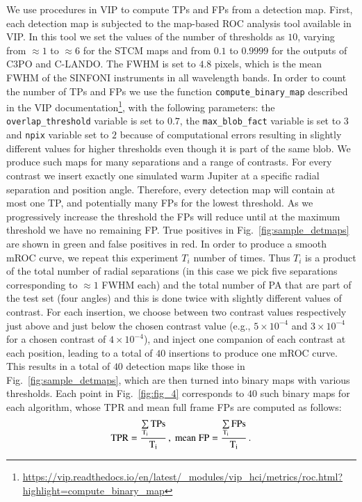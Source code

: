 \documentclass{aa}
\begin{document}
We use procedures in VIP \citep{2017AJGomezVIP,2023Christiaens} to compute TPs and FPs from a detection map. First, each detection map is subjected to the map-based ROC analysis tool available in VIP. In this tool we set the values of the number of thresholds as $10$, varying from $\approx 1$ to $\approx 6$ for the STCM maps and from $0.1$ to $0.9999$ for the outputs of C3PO and C-LANDO. The FWHM is set to $4.8$ pixels, which is the mean FWHM of the SINFONI instruments in all wavelength bands. 
In order to count the number of TPs and FPs we use the function \texttt{compute\_binary\_map} described in the VIP documentation\footnote{\url{https://vip.readthedocs.io/en/latest/_modules/vip_hci/metrics/roc.html?highlight=compute_binary_map}}, with the following parameters: the \texttt{overlap\_threshold} variable is set to $0.7$, the \texttt{max\_blob\_fact} variable is set to $3$ and \texttt{npix} variable set to $2$ because of computational errors resulting in slightly different values for higher thresholds even though it is part of the same blob.
We produce such maps for many separations and a range of contrasts.
For every contrast we insert exactly one simulated warm Jupiter at a specific radial separation and position angle.
Therefore, every detection map will contain at most one TP, and potentially many FPs for the lowest threshold. 
As we progressively increase the threshold the FPs will reduce until at the maximum threshold we have no remaining FP. 
True positives in Fig.~\ref{fig:sample_detmaps} are shown in green and false positives in red.
In order to produce a smooth mROC curve, we repeat this experiment $T_{i}$ number of times.
Thus $T_{i}$ is a product of the total number of radial separations (in this case we pick five separations corresponding to $\approx 1$ FWHM each) and the total number of PA that are part of the test set (four angles) and this is done twice with slightly different values of contrast.
For each insertion, we choose between two contrast values respectively just above and just below the chosen contrast value (e.g., $5\times10^{-4}$ and $3\times10^{-4}$ for a chosen contrast of $4\times10^{-4}$), and inject one companion of each contrast at each position, leading to a total of $40$ insertions to produce one mROC curve.
This results in a total of $40$ detection maps like those in Fig.~\ref{fig:sample_detmaps}, which are then turned into binary maps with various thresholds. 
Each point in Fig.~\ref{fig:fig_4} corresponds to $40$ such binary maps for each algorithm, whose TPR and mean full frame FPs are computed as follows:
\begin{equation}
\rm{TPR} =\dfrac{\sum\limits_{T_i}\rm{TPs}}{T_i} \, , \; 
\rm{mean\; FP} = \dfrac{\sum\limits_{T_i}FPs}{T_i} \, .
\label{eq:TPR}
\end{equation}
\end{document}
